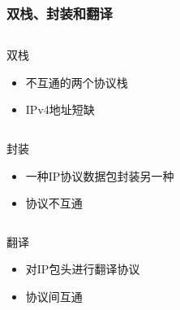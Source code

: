 \documentclass{beamer}
\begin{document}
\begin{frame}
  \frametitle{双栈、封装和翻译}

  \vspace{-1em}
  \begin{columns}[T] %
    \begin{column}{.29\textwidth}
      \begin{block}{双栈}
        \begin{itemize}
        \item 不互通的两个协议栈
        \item IPv4地址短缺
        \end{itemize}
      \end{block}
    \end{column}
    \hfill
    \begin{column}{.70\textwidth}
    \end{column}
  \end{columns}
  \begin{columns}[T]
    \begin{column}{.29\textwidth}
      \begin{block}{封装}
        \begin{itemize}
        \item 一种IP协议数据包封装另一种
        \item 协议不互通
        \end{itemize}
      \end{block}
    \end{column}
    \hfill
    \begin{column}{.70\textwidth}
    \end{column}
  \end{columns}
  \begin{columns}[T]
    \begin{column}{.29\textwidth}
      \begin{block}{翻译}
        \begin{itemize}
        \item 对IP包头进行翻译协议
        \item 协议间互通
        \end{itemize}
      \end{block}
    \end{column}
    \hfill
    \begin{column}{.70\textwidth}
    \end{column}
  \end{columns}
\end{frame}
\end{document}
